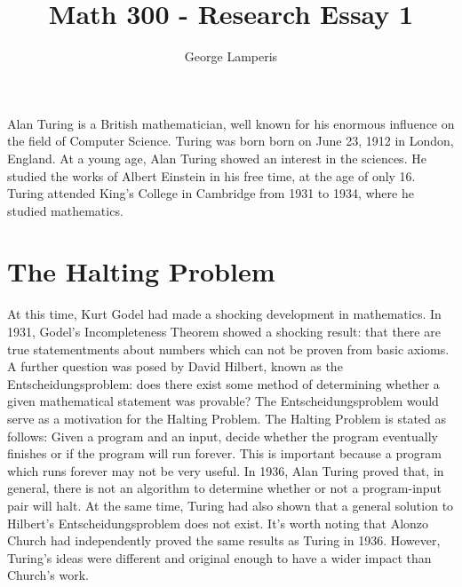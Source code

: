\documentclass[12pt]{article}
\title{Math 300 - Research Essay 1}
\author{George Lamperis}
\date{}
\theoremstyle{mystyle}
\begin{document}
\maketitle

Alan Turing is a British mathematician, well known for his enormous influence on
the field of Computer Science. Turing was born born on June 23, 1912 in London,
England. At a young age, Alan Turing showed an interest in the sciences. He
studied the works of Albert Einstein in his free time, at the age of only 16.
Turing attended King's College in Cambridge from 1931 to 1934, where he studied
mathematics. 

\section*{The Halting Problem}
At this time, Kurt Godel had made a shocking development in
mathematics. In 1931, Godel's Incompleteness Theorem showed a shocking result:
that there are true statementments about numbers which can not be proven from
basic axioms. A further question was posed by David Hilbert, known as the
Entscheidungsproblem: does there exist some method of determining whether a 
given mathematical statement was provable? The Entscheidungsproblem would serve
as a motivation for the Halting Problem. The Halting Problem is stated as
follows: Given a program and an input, decide whether the program eventually 
finishes or if the program will run forever. This is important because a program
which runs forever may not be very useful. In 1936, Alan Turing proved that, in 
general, there is not an algorithm to determine whether or not a program-input 
pair will halt. At the same time, Turing had also shown that a general solution
to Hilbert's Entscheidungsproblem does not exist. It's worth noting that Alonzo
Church had independently proved the same results as Turing in 1936. However,
Turing's ideas were different and original enough to have a wider impact than
Church's work.
\end{document}
